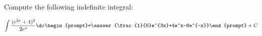 \documentclass{ximera}
\author{Jim Talamo}
\begin{document}
\begin{exercise}
Compute the following indefinite integral:

\[
\int \frac{(e^{2x}+4)^2}{2e^x}  \d x 
\begin{prompt}=\answer{\frac{1}{6}e^{3x}+4e^x-8e^{-x}}\end{prompt}+C
\]
\end{exercise}
\end{document}
